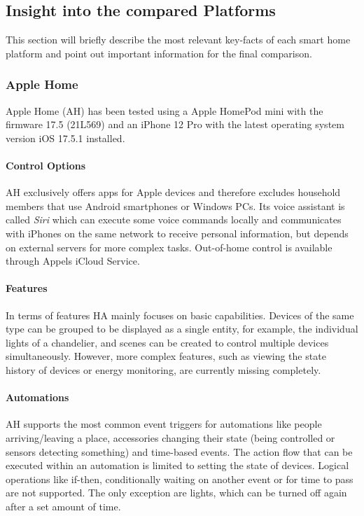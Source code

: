 \newpage

\subsection{Insight into the compared Platforms} \label{sec:obs_evaluation}

This section will briefly describe the most relevant key-facts of each smart home platform and point out important information for the final comparison.

\subsubsection{Apple Home}
Apple Home (AH) has been tested using a Apple HomePod mini with the firmware 17.5 (21L569) and an iPhone 12 Pro with the latest operating system version iOS 17.5.1 installed.

\paragraph{Control Options}
AH exclusively offers apps for Apple devices and therefore excludes household members that use Android smartphones or Windows PCs. Its voice assistant is called \textit{Siri} which can execute some voice commands locally and communicates with iPhones on the same network to receive personal information, but depends on external servers for more complex tasks. Out-of-home control is available through Appels iCloud Service.

\paragraph{Features}
In terms of features HA mainly focuses on basic capabilities. Devices of the same type can be grouped to be displayed as a single entity, for example, the individual lights of a chandelier, and scenes can be created to control multiple devices simultaneously. However, more complex features, such as viewing the state history of devices or energy monitoring, are currently missing completely.

\paragraph{Automations}
AH supports the most common event triggers for automations like people arriving/leaving a place, accessories changing their state (being controlled or sensors detecting something) and time-based events. The action flow that can be executed within an automation is limited to setting the state of devices. Logical operations like if-then, conditionally waiting on another event or for time to pass are not supported. The only exception are lights, which can be turned off again after a set amount of time.

